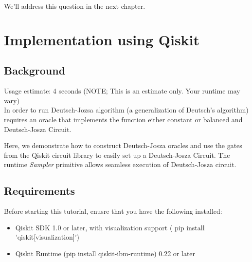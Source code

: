 \documentclass[12pt, oneside]{book}
\theoremstyle{definition}
\theoremstyle{definition}
\theoremstyle{remark}
\begin{document}
We'll address this question in the next chapter.

\section{Implementation using Qiskit}
\subsection{Background}
Usage estimate: 4 seconds (NOTE; This is an estimate only. Your runtime may vary)\\
In order to run Deutsch-Jozsa algorithm (a generalization of Deutsch's algorithm) requires an oracle that implements the function either constant or balanced and Deutsch-Josza Circuit.

Here, we demonstrate how to construct Deutsch-Josza oracles and use the gates from the Qiskit circuit library to easily set up a Deutsch-Josza Circuit. The runtime \textit{Sampler} primitive allows seamless execution of Deutsch-Josza circuit.

\subsection{Requirements}
Before starting this tutorial, enusre that you have the following installed:
\begin{itemize}
    \item Qiskit SDK 1.0 or later, with visualization support ( pip install 'qiskit[visualization]')
    \item Qiskit Runtime (pip install qiskit-ibm-runtime) 0.22 or later
\end{itemize}
\end{document}
